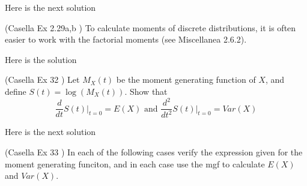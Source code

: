 \documentclass[12pt,letterpaper]{exam}
\begin{document}
\begin{questions}
	\begin{solution}
		Here is the next solution
	\end{solution}

	\setcounter{question}{28}
	\question (Casella Ex 2.29a,b ) To calculate moments of discrete distributions, it is often easier to work with the factorial moments (see Miscellanea 2.6.2). 
	
	\begin{solution}
		Here is the solution
	\end{solution}
	
	\setcounter{question}{31}
	\question  (Casella Ex 32 ) Let $M_X(t)$ be the moment generating function of $X$, and define $S(t) = \log{(M_X(t))}$. Show that
	$$ \frac{d}{dt} \left. S(t) \right|_{t=0} = E(X) \text{ and }  \frac{d^2}{dt^2} \left. S(t) \right|_{t=0} = Var(X)$$
	\begin{solution}
		Here is the next solution
	\end{solution}
	
	\question  (Casella Ex 33 ) In each of the following cases verify the expression given for the moment generating funciton, and in each case use the mgf to calculate $E(X)$ and $Var(X)$.
\end{questions}
\end{document}
